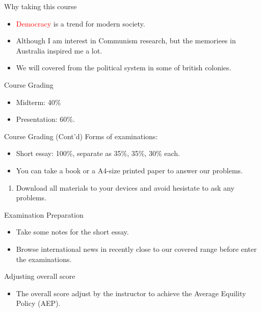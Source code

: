 \documentclass{beamer}
\begin{document}
\begin{frame}{Why taking this course}
\begin{itemize}
\item \textcolor{red}{Democracy} is a trend for modern society. \\
\item Although I am interest in Communism research, but the memoriees in Australia inspired me a lot. \\
\item We will covered from the political system in some of british colonies.
\end{itemize}
\end{frame}
\begin{frame}{Course Grading}
\begin{itemize}
\item Midterm: 40\%
\item Presentation: 60\%.
\end{itemize}
\end{frame}
\begin{frame}{Course Grading (Cont'd)}
Forms of examinations:
\begin{itemize}
\item Short essay: 100\%, separate as 35\%, 35\%, 30\% each.
\item You can take a book or a A4-size printed paper to answer our problems.
\end{itemize}
\begin{enumerate}
\item Download all materials to your devices and avoid hesistate to ask any problems.
\end{enumerate}
\end{frame}
\begin{frame}{Examination Preparation}
\begin{itemize}
\item Take some notes for the short essay.
\item Browse international news in recently close to our covered range before enter the examinations.
\end{itemize}
\begin{block}{Adjusting overall score}
\begin{itemize}
\item The overall score adjust by the instructor to achieve the Average Equility Policy (AEP).
\end{itemize}
\end{block}
\end{frame}
\end{document}
